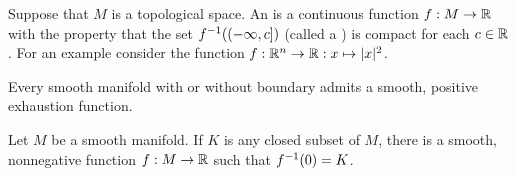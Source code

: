 \dfn Suppose that $M$ is a topological space. An  is a continuous function $f:M\rightarrow \mathbb{R}$ with the property that the set $f^{-1}((-\infty, c])$ (called a ) is compact for each $c\in \mathbb{R}$. For an example consider the function $f:\mathbb{R}^n\rightarrow \mathbb{R}:x\mapsto |x|^2$.

\setcounter{thm}{27}

\begin{prop}
Every smooth manifold with or without boundary admits a smooth, positive exhaustion function.
\end{prop}

\begin{thm}
Let $M$ be a smooth manifold. If $K$ is any closed subset of $M$, there is a smooth, nonnegative function $f:M\rightarrow \mathbb{R}$ such that $f^{-1}(0) = K$.
\end{thm}











